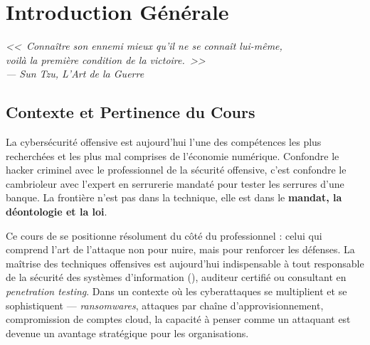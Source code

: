 
\chapter*{Introduction Générale}

\begin{flushright}
    \itshape
    <<~Connaître son ennemi mieux qu'il ne se connaît lui-même,\\
    voilà la première condition de la victoire.~>>\\[0.5ex]
    \small--- Sun Tzu, \textit{L'Art de la Guerre}
\end{flushright}

\vspace{1.5ex}

\section*{Contexte et Pertinence du Cours}

La cybersécurité offensive est aujourd'hui l'une des compétences les plus recherchées
et les plus mal comprises de l'économie numérique. Confondre le hacker criminel avec
le professionnel de la sécurité offensive, c'est confondre le cambrioleur avec l'expert
en serrurerie mandaté pour tester les serrures d'une banque. La frontière n'est pas
dans la technique, elle est dans le \textbf{mandat, la déontologie et la loi}.

Ce cours de  se positionne résolument du côté du
professionnel : celui qui comprend l'art de l'attaque non pour nuire, mais pour
renforcer les défenses. La maîtrise des techniques offensives est aujourd'hui
indispensable à tout responsable de la sécurité des systèmes d'information
(), auditeur certifié  ou consultant en \textit{penetration
testing}. Dans un contexte où les cyberattaques se multiplient et se sophistiquent
— \textit{ransomwares}, attaques par chaîne d'approvisionnement, compromission de
comptes cloud, la capacité à penser comme un attaquant est devenue un avantage
stratégique pour les organisations.

